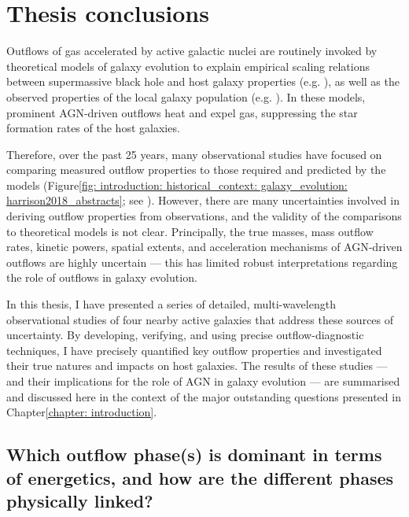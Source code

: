 \section{Thesis conclusions}
\label{chapter: conclusions_and_future_work: conclusions: introduction}

Outflows of gas accelerated by active galactic nuclei are routinely invoked by theoretical models of galaxy evolution to explain empirical scaling relations between supermassive black hole and host galaxy properties (e.g. \citealt{Silk1998, King2003, DiMatteo2005}), as well as the observed properties of the local galaxy population (e.g. \citealt{Schaye2015, Dave2019, Zinger2020}). In these models, prominent AGN-driven outflows heat and expel gas, suppressing the star formation rates of the host galaxies. 

Therefore, over the past 25 years, many observational studies have focused on comparing measured outflow properties to those required and predicted by the models (Figure\;\ref{fig: introduction: historical_context: galaxy_evolution: harrison2018_abstracts}; see \citealt{Harrison2018}). However, there are many uncertainties involved in deriving outflow properties from observations, and the validity of the comparisons to theoretical models is not clear. Principally, the true masses, mass outflow rates, kinetic powers, spatial extents, and acceleration mechanisms of AGN-driven outflows are highly uncertain --- this has limited robust interpretations regarding the role of outflows in galaxy evolution.

In this thesis, I have presented a series of detailed, multi-wavelength observational studies of four nearby active galaxies that address these sources of uncertainty. By developing, verifying, and using precise outflow-diagnostic techniques, I have precisely quantified key outflow properties and investigated their true natures and impacts on host galaxies. The results of these studies --- and their implications for the role of AGN in galaxy evolution --- are summarised and discussed here in the context of the major outstanding questions presented in Chapter\;\ref{chapter: introduction}.

\subsection{Which outflow phase(s) is dominant in terms of energetics, and how are the different
phases physically linked?}
\label{chapter: conclusions_and_future_work: conclusions: introduction: multiphase}

